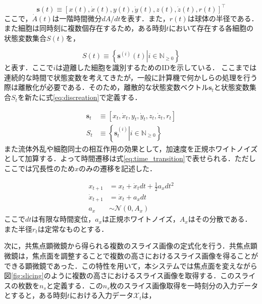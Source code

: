 \begin{equation}
    \label{eq:state_vector}
    \bm{s}(t) \equiv \left[x(t), \dot{x}(t), y(t), \dot{y}(t), z(t), \dot{z}(t), r(t)\right]^{\top}
\end{equation}
ここで，$\dot{A}(t)$は一階時間微分$dA/dt$を表す．また，$r(t)$は球体の半径である．また細胞は同時刻に複数個存在するため，ある時刻$t$において存在する各細胞の状態変数集合$S(t)$を，

\begin{equation}
    S(t) \equiv \left\{\left.\bm{s}^{(i)}(t)\right| i \in \mathbb{N}_{\geq 0}\right\}
\end{equation}
と表す．ここで$i$は遊離した細胞を識別するためのIDを示している．
ここまでは連続的な時間で状態変数を考えてきたが，一般に計算機で何かしらの処理を行う際は離散化が必要である．そのため，離散的な状態変数ベクトル$\bm{s}_t$と状態変数集合$S_t$を新たに式\ref{eq:discreation}で定義する．

\begin{equation}
    \label{eq:discreation}
    \begin{aligned}
        \bm{s}_t &\equiv \left[x_t, \dot{x}_t, y_t, \dot{y}_t, z_t, \dot{z}_t, r_t\right]
        \\ S_t &\equiv \left\{\left.\bm{s}^{(i)}_t\right| i \in \mathbb{N}_{\geq 0}\right\}
    \end{aligned}
\end{equation}
また流体外乱や細胞同士の相互作用の効果として，加速度を正規ホワイトノイズとして加算する．よって時間遷移は式\ref{eq:time_transition}で表せられる．ただしここでは冗長性のため$x$のみの遷移を記述した．

\begin{equation}
    \label{eq:time_transition}
    \begin{aligned}
        x_{t+1} &= x_t + \dot{x}_t dt + \frac{1}{2} a_x dt^2
        \\ \dot{x}_{t+1} &= \dot{x}_t + a_x dt
        \\ a_x & \sim \mathcal{N}(0, A_x)
    \end{aligned}
\end{equation}
ここで$dt$は有限な時間変位，$a_x$は正規ホワイトノイズ，$A_x$はその分散である．また半径$r_t$は定常なものとする．
\par
次に，共焦点顕微鏡から得られる複数のスライス画像の定式化を行う．共焦点顕微鏡は，焦点面を調整することで複数の高さにおけるスライス画像を得ることができる顕微鏡であった．この特性を用いて，本システムでは焦点面を変えながら図\ref{fig:slicing}のように複数の高さにおけるスライス画像を取得する．このスライスの枚数を$n_s$と定義する．この$n_s$枚のスライス画像取得を一時刻分の入力データとすると，ある時刻$t$における入力データ$\mathcal{X}_t$は，

